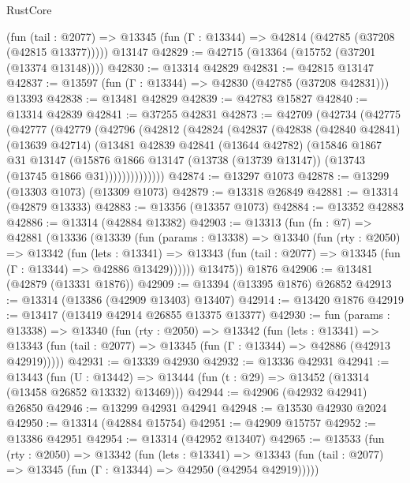 \begin{lexlean}{RustCore}
\begin{coremodule}
    (fun (tail : @2077) => @13345 (fun (Γ : @13344) => @42814 (@42785 (@37208 (@42815 @13377)))))
    @13147
@42829 := @42715 (@13364 (@15752 (@37201 (@13374 @13148))))
@42830 := @13314 @42829
@42831 := @42815 @13147
@42837 := @13597 (fun (Γ : @13344) => @42830 (@42785 (@37208 @42831))) @13393
@42838 := @13481 @42829
@42839 := @42783 @15827
@42840 := @13314 @42839
@42841 := @37255 @42831
@42873 := @42709
    (@42734
      (@42775
        (@42777
          (@42779
            (@42796
              (@42812
                (@42824
                  (@42837
                    (@42838
                      (@42840 @42841)
                      (@13639 @42714)
                      (@13481
                        @42839
                        @42841
                        (@13644 @42782)
                        (@15846
                          @1867
                          @31
                          @13147
                          (@15876
                            @1866
                            @13147
                            (@13738 (@13739 @13147))
                            (@13743 (@13745 @1866 @31))))))))))))))
@42874 := @13297 @1073
@42878 := @13299 (@13303 @1073) (@13309 @1073)
@42879 := @13318 @26849
@42881 := @13314 (@42879 @13333)
@42883 := @13356 (@13357 @1073)
@42884 := @13352 @42883
@42886 := @13314 (@42884 @13382)
@42903 := @13313
    (fun (fn : @7) =>
    @42881
      (@13336
        (@13339
          (fun (params : @13338) =>
          @13340
            (fun (rty : @2050) =>
            @13342
              (fun (lets : @13341) =>
              @13343 (fun (tail : @2077) => @13345 (fun (Γ : @13344) => @42886 @13429))))))
        @13475))
    @1876
@42906 := @13481 (@42879 (@13331 @1876))
@42909 := @13394 (@13395 @1876) @26852
@42913 := @13314 (@13386 (@42909 @13403) @13407)
@42914 := @13420 @1876
@42919 := @13417 (@13419 @42914 @26855 @13375 @13377)
@42930 := fun (params : @13338) =>
  @13340
    (fun (rty : @2050) =>
    @13342
      (fun (lets : @13341) =>
      @13343 (fun (tail : @2077) => @13345 (fun (Γ : @13344) => @42886 (@42913 @42919)))))
@42931 := @13339 @42930
@42932 := @13336 @42931
@42941 := @13443
    (fun (U : @13442) => @13444 (fun (t : @29) => @13452 (@13314 (@13458 @26852 @13332) @13469)))
@42944 := @42906 (@42932 @42941) @26850
@42946 := @13299 @42931 @42941
@42948 := @13530 @42930 @2024
@42950 := @13314 (@42884 @15754)
@42951 := @42909 @15757
@42952 := @13386 @42951
@42954 := @13314 (@42952 @13407)
@42965 := @13533
    (fun (rty : @2050) =>
    @13342
      (fun (lets : @13341) =>
      @13343 (fun (tail : @2077) => @13345 (fun (Γ : @13344) => @42950 (@42954 @42919)))))

\end{coremodule}
\end{lexlean}
